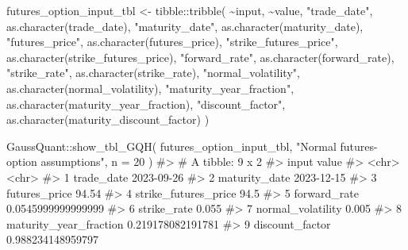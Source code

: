 \documentclass[
  letterpaper,
  DIV=11,
  numbers=noendperiod]{scrreprt}
\newenvironment{Shaded}{\begin{snugshade}}{\end{snugshade}}
\newcommand{\AttributeTok}[1]{\textcolor[rgb]{0.40,0.45,0.13}{#1}}
\newcommand{\CommentTok}[1]{\textcolor[rgb]{0.37,0.37,0.37}{#1}}
\newcommand{\DecValTok}[1]{\textcolor[rgb]{0.68,0.00,0.00}{#1}}
\newcommand{\FunctionTok}[1]{\textcolor[rgb]{0.28,0.35,0.67}{#1}}
\newcommand{\NormalTok}[1]{\textcolor[rgb]{0.00,0.23,0.31}{#1}}
\newcommand{\OtherTok}[1]{\textcolor[rgb]{0.00,0.23,0.31}{#1}}
\newcommand{\SpecialCharTok}[1]{\textcolor[rgb]{0.37,0.37,0.37}{#1}}
\newcommand{\StringTok}[1]{\textcolor[rgb]{0.13,0.47,0.30}{#1}}
\begin{document}
\begin{Shaded}
\begin{Highlighting}[]
\NormalTok{futures\_option\_input\_tbl }\OtherTok{\textless{}{-}}\NormalTok{ tibble}\SpecialCharTok{::}\FunctionTok{tribble}\NormalTok{(}
  \SpecialCharTok{\textasciitilde{}}\NormalTok{input,                   }\SpecialCharTok{\textasciitilde{}}\NormalTok{value,}
  \StringTok{"trade\_date"}\NormalTok{,             }\FunctionTok{as.character}\NormalTok{(trade\_date),}
  \StringTok{"maturity\_date"}\NormalTok{,          }\FunctionTok{as.character}\NormalTok{(maturity\_date),}
  \StringTok{"futures\_price"}\NormalTok{,          }\FunctionTok{as.character}\NormalTok{(futures\_price),}
  \StringTok{"strike\_futures\_price"}\NormalTok{,   }\FunctionTok{as.character}\NormalTok{(strike\_futures\_price),}
  \StringTok{"forward\_rate"}\NormalTok{,           }\FunctionTok{as.character}\NormalTok{(forward\_rate),}
  \StringTok{"strike\_rate"}\NormalTok{,            }\FunctionTok{as.character}\NormalTok{(strike\_rate),}
  \StringTok{"normal\_volatility"}\NormalTok{,      }\FunctionTok{as.character}\NormalTok{(normal\_volatility),}
  \StringTok{"maturity\_year\_fraction"}\NormalTok{, }\FunctionTok{as.character}\NormalTok{(maturity\_year\_fraction),}
  \StringTok{"discount\_factor"}\NormalTok{,        }\FunctionTok{as.character}\NormalTok{(maturity\_discount\_factor)}
\NormalTok{)}

\NormalTok{GaussQuant}\SpecialCharTok{::}\FunctionTok{show\_tbl\_GQH}\NormalTok{(}
\NormalTok{  futures\_option\_input\_tbl,}
  \StringTok{"Normal futures{-}option assumptions"}\NormalTok{,}
  \AttributeTok{n =} \DecValTok{20}
\NormalTok{)}
\CommentTok{\#\textgreater{} \# A tibble: 9 x 2}
\CommentTok{\#\textgreater{}   input                  value             }
\CommentTok{\#\textgreater{}   \textless{}chr\textgreater{}                  \textless{}chr\textgreater{}             }
\CommentTok{\#\textgreater{} 1 trade\_date             2023{-}09{-}26        }
\CommentTok{\#\textgreater{} 2 maturity\_date          2023{-}12{-}15        }
\CommentTok{\#\textgreater{} 3 futures\_price          94.54             }
\CommentTok{\#\textgreater{} 4 strike\_futures\_price   94.5              }
\CommentTok{\#\textgreater{} 5 forward\_rate           0.0545999999999999}
\CommentTok{\#\textgreater{} 6 strike\_rate            0.055             }
\CommentTok{\#\textgreater{} 7 normal\_volatility      0.005             }
\CommentTok{\#\textgreater{} 8 maturity\_year\_fraction 0.219178082191781 }
\CommentTok{\#\textgreater{} 9 discount\_factor        0.988234148959797}
\end{Highlighting}
\end{Shaded}
\end{document}
